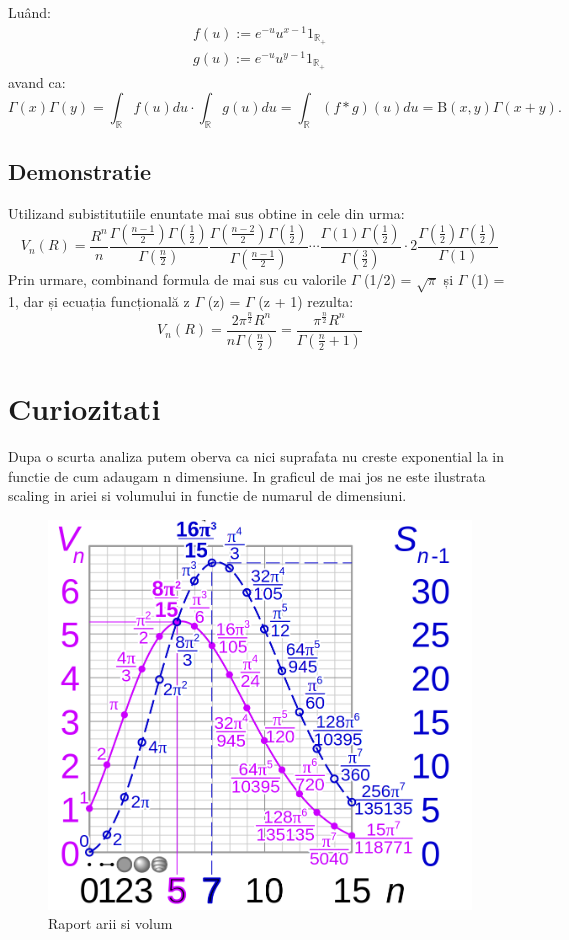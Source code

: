 \documentclass[12pt]{caltech_thesis}
\begin{document}
Luând:
$$
\begin{array}{l}
f(u):=e^{-u} u^{x-1} 1_{\mathbb{R}_{+}} \\
g(u):=e^{-u} u^{y-1} 1_{\mathbb{R}_{+}}
\end{array}
$$
avand ca:
$$
\Gamma(x) \Gamma(y)=\int_{\mathbb{R}} f(u) d u \cdot \int_{\mathbb{R}} g(u) d u=\int_{\mathbb{R}}(f * g)(u) d u=\mathrm{B}(x, y) \Gamma(x+y) .
$$



\section{Demonstratie}
Utilizand subistitutiile enuntate mai sus obtine in cele din urma:
$$
V_{n}(R)=\frac{R^{n}}{n} \frac{\Gamma\left(\frac{n-1}{2}\right) \Gamma\left(\frac{1}{2}\right)}{\Gamma\left(\frac{n}{2}\right)} \frac{\Gamma\left(\frac{n-2}{2}\right) \Gamma\left(\frac{1}{2}\right)}{\Gamma\left(\frac{n-1}{2}\right)} \cdots \frac{\Gamma(1) \Gamma\left(\frac{1}{2}\right)}{\Gamma\left(\frac{3}{2}\right)} \cdot 2 \frac{\Gamma\left(\frac{1}{2}\right) \Gamma\left(\frac{1}{2}\right)}{\Gamma(1)}
$$
Prin urmare, combinand formula de mai sus cu valorile \(\Gamma\) (1/2) = \(\sqrt{ \pi }\)  și  \(\Gamma\) (1) = 1, dar și ecuația funcțională z \(\Gamma\) (z) = \(\Gamma\) (z + 1) rezulta:
$$
V_{n}(R)=\frac{2 \pi^{\frac{n}{2}} R^{n}}{n \Gamma\left(\frac{n}{2}\right)}=\frac{\pi^{\frac{n}{2}} R^{n}}{\Gamma\left(\frac{n}{2}+1\right)}
$$




\newpage
\chapter{Curiozitati}
\text


Dupa o scurta analiza putem oberva ca nici suprafata nu creste exponential la in functie de cum adaugam n dimensiune. In graficul de mai jos ne este ilustrata scaling in ariei si volumului in functie de numarul de dimensiuni.

\begin{figure}[hbt!]
\centering
\includegraphics[width=.9\textwidth]{rap_arrii.png}
\caption{Raport arii si volum}\label{fig:logo}
\end{figure}
\end{document}
